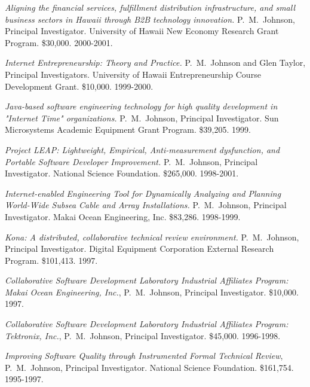 \begin{Awarded Grant Support}
\item {\em  Aligning the financial services, fulfillment distribution
infrastructure, and small business sectors in Hawaii through B2B technology 
innovation.}    
P.~M.~Johnson, Principal Investigator.
University of Hawaii New Economy Research Grant Program.
\$30,000.  2000-2001.


\item {\em  Internet Entrepreneurship: Theory and Practice. 
}
  P.~M.~Johnson and Glen Taylor, Principal Investigators.
  University of Hawaii Entrepreneurship Course Development Grant. 
    \$10,000. 1999-2000.


\item {\em Java-based software engineering technology
                   for high quality development in "Internet Time"
                   organizations.}
  P.~M.~Johnson, Principal Investigator.
  Sun Microsystems Academic Equipment Grant Program.
    \$39,205. 1999.


\item {\em Project LEAP: Lightweight, Empirical, Anti-measurement
dysfunction, and Portable Software Developer Improvement.}
  P.~M.~Johnson, Principal Investigator.
  National Science Foundation.
    \$265,000. 1998-2001.


\item {\em Internet-enabled Engineering Tool for Dynamically Analyzing and
Planning World-Wide Subsea Cable and Array Installations.}
  P.~M.~Johnson, Principal Investigator.
  Makai Ocean Engineering, Inc.
    \$83,286. 1998-1999.

\item {\em Kona: A distributed, collaborative technical review environment.}
  P.~M.~Johnson, Principal Investigator.
  Digital Equipment Corporation External Research Program.
    \$101,413. 1997.
    
  \item {\em Collaborative Software Development Laboratory Industrial
      Affiliates Program: Makai Ocean Engineering, Inc.}, P.~M.~Johnson,
    Principal Investigator. \$10,000. 1997.
  
\item {\em Collaborative Software Development Laboratory Industrial
    Affiliates Program: Tektronix, Inc.}, P.~M.~Johnson, Principal
    Investigator. \$45,000. 1996-1998.

\item {\em Improving Software Quality through Instrumented Formal Technical
  Review}, P.~M.~Johnson, Principal Investigator.  National
  Science Foundation.  \$161,754. 1995-1997.
  

\end{Awarded Grant Support}
